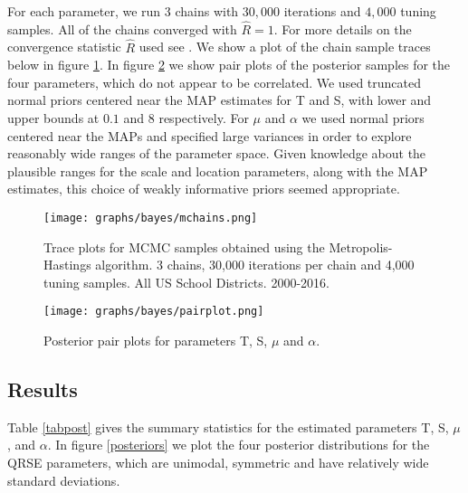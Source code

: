 \medskip 

For each parameter, we run 3 chains with $30,000$ iterations and
$4,000$ tuning samples. All of the chains converged with $\hat{R}
=1$. For more details on the convergence statistic $\hat{R}$ used see
\citet{vehtari2019rank}. We show a plot of the chain sample
traces below in figure \ref{mctrace}. In figure \ref{pairplot} we show
pair plots of the posterior samples for the four parameters, which do
not appear to be correlated. We used truncated normal priors centered
near the MAP estimates for T and S, with lower and upper bounds at
$0.1$ and $8$ respectively. For $\mu$ and $\alpha$ we used normal
priors centered near the MAPs and specified large variances in order
to explore reasonably wide ranges of the parameter space. Given
knowledge about the plausible ranges for the scale and location
parameters, along with the MAP estimates, this choice of weakly
informative priors seemed appropriate.


\begin{figure}[htb]
\centering
\texttt{[image: graphs/bayes/mchains.png]}
\caption{\label{mctrace}Trace plots for MCMC samples obtained using the Metropolis-Hastings algorithm. 3 chains, 30,000 iterations per chain and 4,000 tuning samples.  All US School Districts. 2000-2016.}
\end{figure}



\begin{figure}[htb]
\centering
\texttt{[image: graphs/bayes/pairplot.png]}
\caption{\label{pairplot}Posterior pair plots for parameters T, S, $\mu$ and $\alpha$.}
\end{figure}


\clearpage

\subsection{Results}
\label{sec-5-3}

Table \ref{tabpost} gives the summary statistics for the estimated
parameters T, S, $\mu$, and $\alpha$. In figure \ref{posteriors} we
plot the four posterior distributions for the QRSE parameters, which
are unimodal, symmetric and have relatively wide standard deviations.


